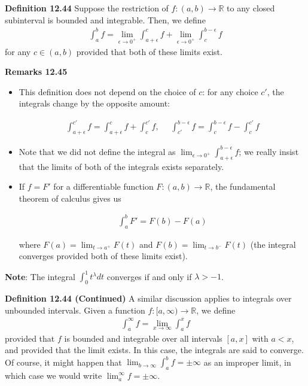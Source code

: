 \documentclass[11pt]{article}
\begin{document}
\textbf{Definition 12.44} Suppose the restriction of $f: (a,b) \to \mathbb{R}$ to any closed subinterval is bounded and integrable. Then, we define 
\begin{align*}
    \int_a^b f = \lim_{\epsilon \to 0^+} \int_{a+\epsilon}^c f + \lim_{\epsilon \to 0^+} \int_c^{b - \epsilon} f
\end{align*}
for any $c \in (a,b)$ provided that both of these limits exist.

\textbf{Remarks 12.45} 
\begin{itemize}
    \item This definition does not depend on the choice of $c$: for any choice $c'$, the integrals change by the opposite amount: 
    
    \begin{align*}
        \int_{a + \epsilon}^{c'} f = \int_{a+\epsilon}^c f + \int_c^{c'}f, ~~~~~~ \int_{c'}^{b - \epsilon}f = \int_c^{b-\epsilon} f - \int_c^{c'} f 
    \end{align*}
    
    \item Note that we did not define the integral as $\lim_{\epsilon \to 0^+} \int_{a + \epsilon}^{b- \epsilon} f$; we really insist that the limits of both of the integrals exists separately.
    
    \item If $f = F'$ for a differentiable function $F: (a,b) \to \mathbb{R}$, the fundamental theorem of calculus gives us 
    
    \begin{align*}
        \int_a^b F' = F(b) - F(a) 
    \end{align*}
    
    where $F(a) = \lim_{t \to a^+} F(t)$ and $F(b) = \lim_{t \to b^-} F(t)$ (the integral converges provided both of these limits exist). 
\end{itemize} 

\textbf{Note}: The integral $\int_0^1 t^\lambda dt$ converges if and only if $\lambda>-1$. 

\textbf{Definition 12.44 (Continued)} A similar discussion applies to integrals over unbounded intervals. Given a function $f: [a, \infty) \to \mathbb{R}$, we define 
\begin{align*}
    \int_a^\infty f = \lim_{x \to \infty} \int_a^x f
\end{align*}
provided that $f$ is bounded and integrable over all intervals $[a,x]$ with $a < x$, and provided that the limit exists. In this case, the integrals are said to converge. Of course, it might happen that $\lim_{b \to \infty} \int_a^b f = \pm \infty$ as an improper limit, in which case we would write $\lim_a^\infty f = \pm \infty$. 
\end{document}
